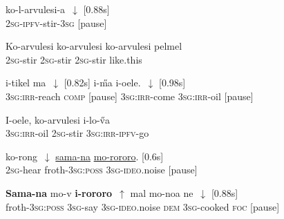 \documentclass[output=paper]{LSP/langsci}
\begin{document}
  \begin{exe}
 \label{Guapp19}
\gll  ko-l-arvulesi-a~$\downarrow$  [0.88s]  \\     	       
\textsc{2sg-ipfv}-stir-\textsc{3sg} [pause]\\
\glt {} 
\end{exe}

  \begin{exe}
 \label{Guapp20}
\gll  Ko-arvulesi    ko-arvulesi ko-arvulesi   pelmel   \\     	       
\textsc{2sg}-stir \textsc{2sg}-stir \textsc{2sg}-stir like.this \\
\glt {} 
\end{exe}

  \begin{exe}
 \label{Guapp21}
\gll   i-tikel            ma~$\downarrow$     [0.82s]          i-\H{m}a           i-oele.~$\downarrow$ [0.98s]    \\     	       
 \textsc{3sg:irr}-reach     \textsc{comp}    [pause]   \textsc{3sg:irr}-come  \textsc{3sg:irr}-oil [pause]\\
\glt {} 
\end{exe}

  \begin{exe}
 \label{Guapp22}
\gll    I-oele, ko-arvulesi i-lo-\H{v}a \\     	       
  \textsc{3sg:irr}-oil \textsc{2sg}-stir  \textsc{3sg:irr-ipfv}-go\\
\glt {} 
\end{exe}

  \begin{exe}
 \label{Guapp23}
\gll   ko-rong~$\downarrow$    \underline{sama-na}               \underline{mo-rororo}.     [0.6s] \\ 
 \textsc{2sg}-hear  froth-\textsc{3sg:poss}     \textsc{3sg}-\textsc{ideo}.noise [pause]\\
\glt {} 
\end{exe}

  \begin{exe}
 \label{Guapp24}
\gll     \textbf{Sama-na}   mo-v            \textbf{i-rororo}~$\uparrow$    mal  mo-noa         ne~$\downarrow$   [0.88s]   \\     	       
 froth-\textsc{3sg:poss}  \textsc{3sg}-say   \textsc{3sg}-\textsc{ideo}.noise \textsc{dem}  \textsc{3sg}-cooked   \textsc{foc} [pause] \\
\glt {} 
\end{exe}
\end{document}
